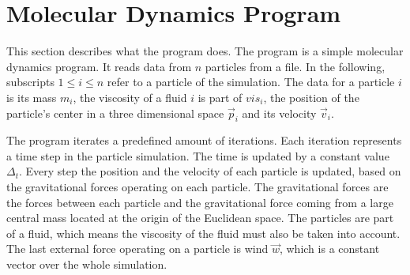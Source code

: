 \documentclass[twoside,11pt]{article}
\begin{document}

\section{Molecular Dynamics Program} %
\label{sec:md}

This section describes what the program does.
The program is a simple molecular dynamics program.
It reads data from $n$ particles from a file.
In the following, subscripts $1 \leq i \leq n$ refer to a particle
of the simulation.
The data for a particle $i$ is its mass $m_i$, the viscosity of
a fluid $i$ is part of $vis_i$, the position of the particle's center
in a three dimensional space $\vec{p}_i$ and its velocity $\vec{v}_i$.

The program iterates a predefined amount of iterations.
Each iteration represents a time step in the particle simulation.
The time is updated by a constant value $\Delta_t$.
Every step the position and the velocity of each particle is
updated, based on the gravitational forces operating on each particle.
The gravitational forces are the forces between each particle and the
gravitational force coming from a large central mass located at the
origin of the Euclidean space.
The particles are part of a fluid, which means the viscosity of
the fluid must also be taken into account.
The last external force operating on a particle is wind $\vec{w}$,
which is a constant vector over the whole simulation.
\end{document}
